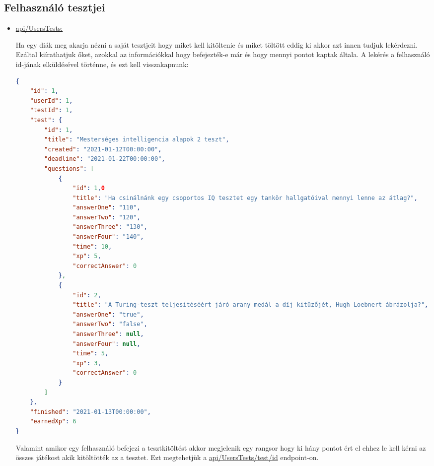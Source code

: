 \subsection{Felhasználó tesztjei}
\begin{itemize}[label={$\bullet$}, topsep=0pt, itemsep=0pt, leftmargin=0pt]
    \item[] {\url{api/UsersTests:}}
          \begin{addmargin}[\parindent]{0pt}
              Ha egy diák meg akarja nézni a saját tesztjeit hogy miket kell kitöltenie és miket töltött eddig ki akkor azt innen tudjuk lekérdezni. Ezáltal kiírathatjuk őket, azokkal az információkkal hogy befejezték-e már és hogy mennyi pontot kaptak általa. A lekérés a felhasználó id-jának elküldésével történne, és ezt kell visszakapnunk:

              \begin{lstlisting}[language=json,firstnumber=1]
{
    "id": 1,
    "userId": 1,
    "testId": 1,
    "test": {
        "id": 1,
        "title": "Mesterséges intelligencia alapok 2 teszt",
        "created": "2021-01-12T00:00:00",
        "deadline": "2021-01-22T00:00:00",
        "questions": [
            {
                "id": 1,0
                "title": "Ha csinálnánk egy csoportos IQ tesztet egy tankör hallgatóival mennyi lenne az átlag?",
                "answerOne": "110",
                "answerTwo": "120",
                "answerThree": "130",
                "answerFour": "140",
                "time": 10,
                "xp": 5,
                "correctAnswer": 0
            },
            {
                "id": 2,
                "title": "A Turing-teszt teljesítéséért járó arany medál a díj kitűzőjét, Hugh Loebnert ábrázolja?",
                "answerOne": "true",
                "answerTwo": "false",
                "answerThree": null,
                "answerFour": null,
                "time": 5,
                "xp": 3,
                "correctAnswer": 0
            }
        ]
    },
    "finished": "2021-01-13T00:00:00",
    "earnedXp": 6
}
                \end{lstlisting}

              Valamint amikor egy felhasználó befejezi a tesztkitöltést akkor megjelenik egy rangsor hogy ki hány pontot ért el ehhez le kell kérni az összes játékost akik kitöltötték az a tesztet. Ezt megtehetjük a \url{api/UsersTests/test/id} endpoint-on.
          \end{addmargin}
\end{itemize}

